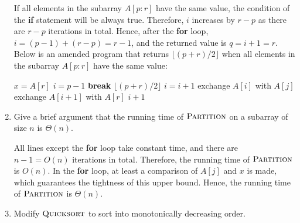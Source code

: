 \documentclass[../Solutions_Introduction_to_Algorithms.tex]{subfiles}
\newif\ifanswer
\begin{document}
\begin{enumerate}[1.]
\ifanswer
{}
If all elements in the subarray $A[p:r]$ have the same value, the condition of the \textbf{if} statement will be always true. Therefore, $i$ increases by $r - p$ as there are $r - p$ iterations in total. Hence, after the \textbf{for} loop, $i = (p - 1) + (r - p) = r - 1$, and the returned value is $q = i + 1 = r$. Below is an amended program that returns $\lfloor(p+r)/2\rfloor$ when all elements in the subarray $A[p:r]$ have the same value:
\begin{algorithm}
    \caption{$\textsc{Partition'}(A, p, r)$}
    \begin{algorithmic}[1]
        \STATE $x = A[r]$
        \STATE $i = p - 1$
                \STATE \textbf{break}
            \ENDIF
            \RETURN $\lfloor(p+r)/2\rfloor$
        \ENDFOR
                \STATE $i = i + 1$
                \STATE exchange $A[i]$ with $A[j]$
            \ENDIF
        \ENDFOR
        \STATE exchange $A[i + 1]$ with $A[r]$
        \RETURN $i + 1$
    \end{algorithmic}
\end{algorithm}
\vspace{1cm}



\item Give a brief argument that the running time of $\textsc{Partition}$ on a subarray of size $n$ is $\Theta(n)$.

\ifanswer
{}
All lines except the \textbf{for} loop take constant time, and there are $n - 1 = O(n)$ iterations in total. Therefore, the running time of $\textsc{Partition}$ is $O(n)$. In the \textbf{for} loop, at least a comparison of $A[j]$ and $x$ is made, which guarantees the tightness of this upper bound. Hence, the running time of $\textsc{Partition}$ is $\Theta(n)$.
\vspace{1cm}



\item Modify $\textsc{Quicksort}$ to sort into monotonically decreasing order.


\end{enumerate}
\end{document}
